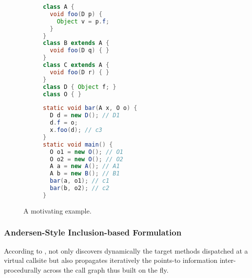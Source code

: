  \begin{figure}[t]
	\centering
\begin{mdframed}[
align=center,
usetwoside=false,
 rightmargin=3cm,
innerleftmargin=4.0ex,
innerrightmargin=-45.0ex,
innertopmargin=0.5ex,
innerbottommargin=0.5ex
]
    \begin{subfigure}{.30\linewidth}
\begin{lstlisting}[language=java, basicstyle=\linespread{0.9}]
class A {
  void foo(D p) {
    Object v = p.f;
  }
}
class B extends A {
  void foo(D q) { }
}
class C extends A {
  void foo(D r) { }
}
class D { Object f; }
class O { }
\end{lstlisting}
    \end{subfigure}
    \begin{subfigure}{.35\linewidth}
\begin{lstlisting}[language=java, firstnumber=14, basicstyle=\linespread{0.9}]
static void bar(A x, O o) {
  D d = new D(); // D1
  d.f = o;
  x.foo(d); // c3
}
static void main() {
  O o1 = new O(); // O1
  O o2 = new O(); // O2
  A a = new A(); // A1
  A b = new B(); // B1
  bar(a, o1); // c1
  bar(b, o2); // c2
}
\end{lstlisting}
    \end{subfigure}
\end{mdframed}
	\caption{A motivating example.
		\label{fig:motivatingExample}}

\end{figure}

\subsubsection{Andersen-Style Inclusion-based Formulation}
\label{subsubsec:inc}
  
According to ,   not only 
discovers dynamically the target methods dispatched at a virtual callsite  but also
propagates iteratively
the points-to information inter-procedurally across the  call graph thus
built on the fly.

